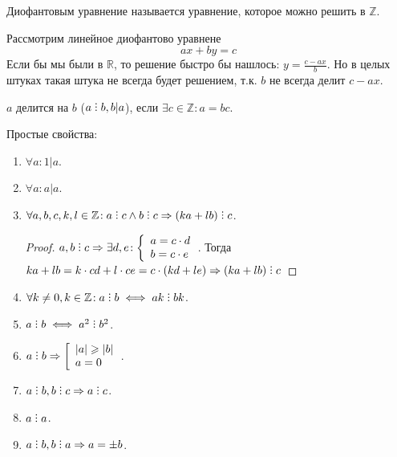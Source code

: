 \begin{definition}
    Диофантовым уравнение называется уравнение, которое можно решить в $\mathbb{Z}$.
\end{definition}
Рассмотрим линейное диофантово уравнене \[
 ax+by=c
\] 
Если бы мы были в $\mathbb{R}$, то решение быстро бы нашлось: $y = \frac{c - ax}{b}$. Но в целых штуках такая штука не всегда будет решением, т.к. $b$ не всегда делит $c - ax$.
 \begin{definition}
     $a$ делится на $b$ ($a \divby b, b \vert a$), если $\exists c \in \mathbb{Z}: a = bc$.
\end{definition}
Простые свойства:
\begin{enumerate}
    \item             
            $\forall a\!: 1 \vert a$.
    \item
            $\forall a\!: a \vert a$.
    \item
        $\forall a, b, c, k, l \in \Z\!: a \divby c \land b \divby c \Rightarrow (ka + lb) \divby c$.
            \begin{proof}
                $a, b \divby c \Rightarrow \exists d, e\!: \left\{\begin{array}{l} a = c \cdot d \\ b = c \cdot e \end{array}\right.$. Тогда  $ka + lb = k \cdot cd + l \cdot ce = c \cdot (kd + le) \Rightarrow (ka + lb) \divby c$
            \end{proof}
    \item
            $\forall k \neq 0, k \in \mathbb{Z}\!: a \divby b \iff ak \divby bk$.
    \item
            $a \divby b \iff a^2 \divby b^2$.
    \item
            $a \divby b \Rightarrow \left[ \begin{array}{l} |a| \ge |b| \\ a = 0 \end{array} \right.$.
    \item
            $a \divby b, b \divby c \Rightarrow a \divby c$.
    \item 
            $a \divby a$.
    \item 
            $a \divby b, b \divby a \Rightarrow a = \pm b$.
\end{enumerate}


